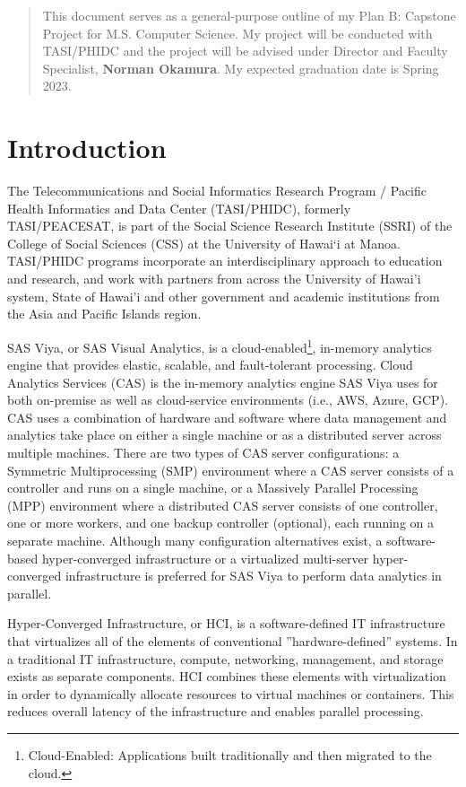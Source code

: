 \documentclass[11pt]{article}
\begin{document}

\begin{abstract}
    This document serves as a general-purpose outline of my Plan B: Capstone Project for M.S. Computer Science. My project will be conducted with TASI/PHIDC and the project will be advised under Director and Faculty Specialist, \textbf{Norman Okamura}. My expected graduation date is Spring 2023. 
\end{abstract}

\section{Introduction}
The Telecommunications and Social Informatics Research Program / Pacific Health Informatics and Data Center (TASI/PHIDC), formerly TASI/PEACESAT, is part of the Social Science Research Institute (SSRI) of the College of  Social Sciences (CSS) at the  University of Hawai‘i at Manoa. TASI/PHIDC programs incorporate an interdisciplinary approach to education and research, and work with partners from across the University of Hawai’i system, State of Hawai’i and other government and academic institutions from the Asia and Pacific Islands region.

SAS Viya, or SAS Visual Analytics, is a cloud-enabled\footnote{Cloud-Enabled: Applications built traditionally and then migrated to the cloud.}, in-memory analytics engine that provides elastic, scalable, and fault-tolerant processing. Cloud Analytics Services (CAS) is the in-memory analytics engine SAS Viya uses for both on-premise as well as cloud-service environments (i.e., AWS, Azure, GCP). CAS uses a combination of hardware and software where data management and analytics take place on either a single machine or as a distributed server across multiple machines. There are two types of CAS server configurations: a Symmetric Multiprocessing (SMP) environment where a CAS server consists of a controller and runs on a single machine, or a Massively Parallel Processing (MPP) environment where a distributed CAS server consists of one controller, one or more workers, and one backup controller (optional), each running on a separate machine. Although many configuration alternatives exist, a software-based hyper-converged infrastructure or a virtualized multi-server hyper-converged infrastructure is preferred for SAS Viya to perform data analytics in parallel. 

Hyper-Converged Infrastructure, or HCI, is a software-defined IT infrastructure that virtualizes all of the elements of conventional ”hardware-defined” systems. In a traditional IT infrastructure, compute, networking, management, and storage exists as separate components. HCI combines these elements with virtualization in order to dynamically allocate resources to virtual machines or containers. This reduces overall latency of the infrastructure and enables parallel processing. 
\end{document}
